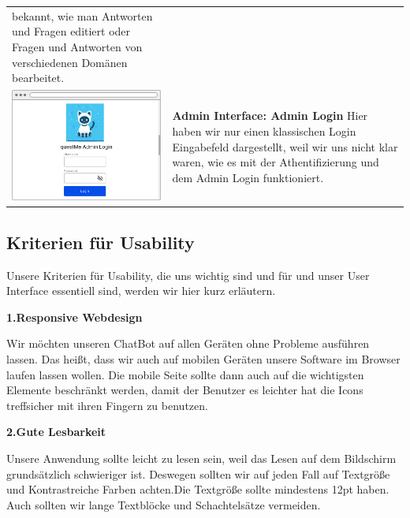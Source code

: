 \begin{tabular}{C{6cm}  L{7cm}}
    bekannt, wie man Antworten und Fragen editiert oder Fragen und Antworten von verschiedenen Domänen bearbeitet. \\
    \includegraphics[width=\linewidth]{bilder/old vers. UI Design/Admin Interface.png} & \textbf{Admin Interface: Admin Login} \newline 
    Hier haben wir nur einen klassischen Login Eingabefeld dargestellt, weil wir uns nicht klar waren, wie es mit der Athentifizierung und dem Admin
    Login funktioniert.
\end{tabular}

\subsection{Kriterien für Usability}
Unsere Kriterien für Usability, die uns wichtig sind und für und unser User Interface
essentiell sind, werden wir hier kurz erläutern.
\medskip

\textbf{1.Responsive Webdesign} 

Wir möchten unseren ChatBot auf allen Geräten ohne Probleme ausführen lassen.
Das heißt, dass wir auch auf mobilen Geräten unsere Software im Browser laufen lassen wollen.
Die mobile Seite sollte dann auch auf die wichtigsten Elemente beschränkt werden, damit 
der Benutzer es leichter hat die Icons treffsicher mit ihren Fingern zu benutzen.
\medskip

\textbf{2.Gute Lesbarkeit}

Unsere Anwendung sollte leicht zu lesen sein, weil das Lesen auf dem Bildschirm 
grundsätzlich schwieriger ist. Deswegen sollten wir auf jeden Fall 
auf Textgröße und Kontrastreiche Farben achten.Die Textgröße sollte mindestens
12pt haben. Auch sollten wir lange Textblöcke und
Schachtelsätze vermeiden.
\medskip

